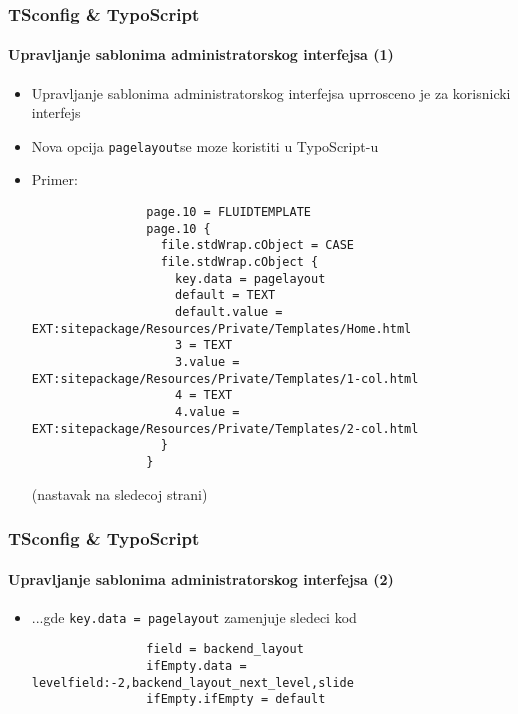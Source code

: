 \begin{frame}[fragile]
	\frametitle{TSconfig \& TypoScript}
	\framesubtitle{Upravljanje sablonima administratorskog interfejsa (1)}

	\lstset{basicstyle=\tiny\ttfamily}

	\begin{itemize}

		\item Upravljanje sablonima administratorskog interfejsa uprrosceno je za korisnicki interfejs

		\item Nova opcija \texttt{pagelayout}se moze koristiti u TypoScript-u

		\item Primer:

			\begin{lstlisting}
				page.10 = FLUIDTEMPLATE
				page.10 {
				  file.stdWrap.cObject = CASE
				  file.stdWrap.cObject {
				    key.data = pagelayout
				    default = TEXT
				    default.value = EXT:sitepackage/Resources/Private/Templates/Home.html
				    3 = TEXT
				    3.value = EXT:sitepackage/Resources/Private/Templates/1-col.html
				    4 = TEXT
				    4.value = EXT:sitepackage/Resources/Private/Templates/2-col.html
				  }
				}
			\end{lstlisting}

			\smaller
				(nastavak na sledecoj strani)
			\normalsize

	\end{itemize}

\end{frame}


\begin{frame}[fragile]
	\frametitle{TSconfig \& TypoScript}
	\framesubtitle{Upravljanje sablonima administratorskog interfejsa (2)}

	\lstset{basicstyle=\tiny\ttfamily}

	\begin{itemize}

		\item ...gde \texttt{key.data = pagelayout} zamenjuje sledeci kod

			\begin{lstlisting}
				field = backend_layout
				ifEmpty.data = levelfield:-2,backend_layout_next_level,slide
				ifEmpty.ifEmpty = default
			\end{lstlisting}

	\end{itemize}

\end{frame}

